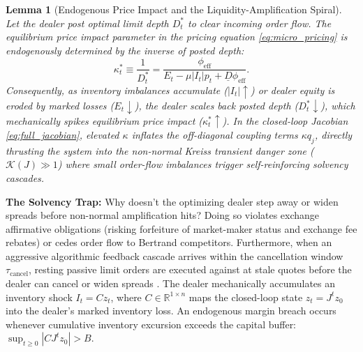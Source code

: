 \documentclass[12pt]{article}
\newtheorem{lemma}[theorem]{Lemma}
\theoremstyle{definition}
\theoremstyle{remark}
\newcommand{\R}{\mathbb{R}}
\begin{document}
\begin{lemma}[Endogenous Price Impact and the Liquidity-Amplification Spiral]
\label{lem:endogenous_kappa}
Let the dealer post optimal limit depth $D_t^*$ to clear incoming order flow. The equilibrium price impact parameter in the pricing equation \eqref{eq:micro_pricing} is endogenously determined by the inverse of posted depth:
\begin{equation}
\kappa_t^* \equiv \frac{1}{D_t^*} = \frac{\phi_{\text{eff}}}{E_t - \mu |I_t| p_t + \underline{D} \phi_{\text{eff}}}.
\label{eq:endogenous_kappa}
\end{equation}
Consequently, as inventory imbalances accumulate ($|I_t| \uparrow$) or dealer equity is eroded by marked losses ($E_t \downarrow$), the dealer scales back posted depth ($D_t^* \downarrow$), which mechanically spikes equilibrium price impact ($\kappa_t^* \uparrow$). In the closed-loop Jacobian \eqref{eq:full_jacobian}, elevated $\kappa$ inflates the off-diagonal coupling terms $\kappa q_j$, directly thrusting the system into the non-normal Kreiss transient danger zone ($\mathcal{K}(J) \gg 1$) where small order-flow imbalances trigger self-reinforcing solvency cascades.
\end{lemma}

\textbf{The Solvency Trap:} Why doesn't the optimizing dealer step away or widen spreads before non-normal amplification hits? Doing so violates exchange affirmative obligations (risking forfeiture of market-maker status and exchange fee rebates) or cedes order flow to Bertrand competitors. Furthermore, when an aggressive algorithmic feedback cascade arrives within the cancellation window $\tau_{\text{cancel}}$, resting passive limit orders are executed against at stale quotes before the dealer can cancel or widen spreads \citep{budish2015}. The dealer mechanically accumulates an inventory shock $I_t = C z_t$, where $C \in \R^{1 \times n}$ maps the closed-loop state $z_t = J^t z_0$ into the dealer's marked inventory loss. An endogenous margin breach occurs whenever cumulative inventory excursion exceeds the capital buffer: $\sup_{t \ge 0} |C J^t z_0| > B$.
\end{document}
